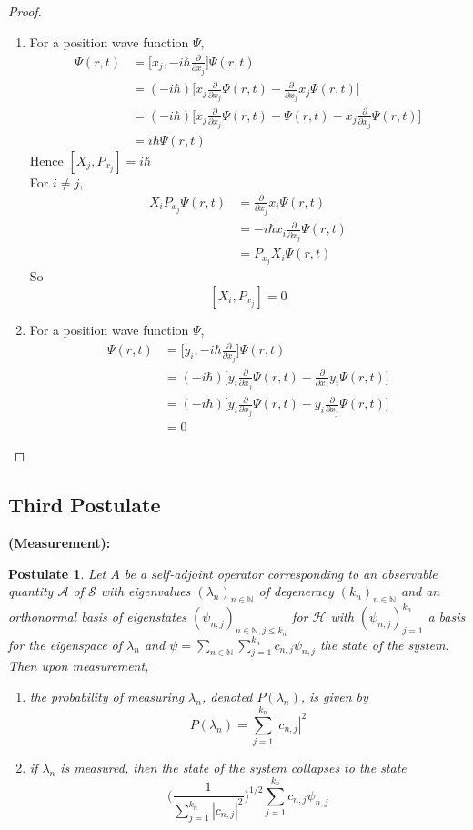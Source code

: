\documentclass[12pt]{amsart}
\newtheorem{pos}{Postulate}
\newcommand{\lam}{\lambda}
\newcommand{\N}{\mathbb{N}}
\newcommand{\MA}{\mathcal{A}}
\newcommand{\MS}{\mathcal{S}}
\newcommand{\MH}{\mathcal{H}}
\newcommand{\p}[1]{\frac{\partial}{\partial{#1}}}
\begin{document}
\begin{proof}\
	\begin{enumerate}
		\item For a position wave function $\Psi$, 
		\begin{align*}
			[X_j, P_j]\Psi(r,t)
			&= \bigg[x_j, -i\hbar \p{x_j} \bigg]\Psi(r,t)\\
			&= (-i\hbar) \bigg[x_j \p{x_j}\Psi(r,t)- \p{x_j}x_j\Psi(r,t)\bigg]\\
			&= (-i\hbar)\bigg[ x_j \p{x_j}\Psi(r,t)- \Psi(r,t) - x_j \p{x_j}\Psi(r,t)\bigg]\\
			&=i\hbar \Psi(r,t)
		\end{align*}
		Hence $[X_j, P_{x_j}] = i\hbar$\vspace{.5cm}\\
		For $i\neq j$, 
		\begin{align*}
			X_iP_{x_j} \Psi(r,t)
			&= \p{x_j}x_i \Psi(r,t)\\
			& = -i \hbar x_i \p{x_j}\Psi(r,t) \\
			&= P_{x_j}X_i \Psi(r,t)
		\end{align*}
		So $$[X_i,P_{x_j}] =0 $$
		\item For a position wave function $\Psi$, 
		\begin{align*}
			[Y_i, P_{x_j}]\Psi(r,t)
			&= \bigg[y_i, -i\hbar \p{x_j}\bigg]\Psi(r,t)\\
			&= (-i\hbar) \bigg[y_i \p{x_j}\Psi(r,t)- \p{x_j}y_i\Psi(r,t)\bigg]\\
			&= (-i\hbar) \bigg[y_i \p{x_j}\Psi(r,t)- y_i\p{x_j}\Psi(r,t)\bigg]\\
			&= 0
		\end{align*}
		
	\end{enumerate}
\end{proof}

\subsection{Third Postulate}\textbf{(Measurement):}
	

	\begin{pos}
		Let $A$ be a self-adjoint operator corresponding to an observable quantity $\MA$ of $\MS$ with eigenvalues $(\lam_{n})_{n \in \N}$ of degeneracy $(k_n)_{n \in \N}$ and an orthonormal basis of eigenstates $(\psi_{n,j})_{n \in \N,j \leq k_n}$ for $\MH$ with $(\psi_{n,j})_{j =1}^{k_n}$ a basis for the eigenspace of $\lam_n$ and $\psi = \sum_{n \in \N} \sum_{j = 1}^{k_n} c_{n,j} \psi_{n,j}$ the state of the system. Then upon measurement,
		\begin{enumerate}
			\item  the probability of measuring $\lam_n$, denoted $P(\lam_n)$, is given by  $$P(\lam_n) = \sum_{j=1}^{k_n} |c_{n,j}|^2$$
			\item if $\lam_n$ is measured, then the state of the system collapses to the state $$ \bigg( \frac{1}{\sum_{j=1}^{k_n} |c_{n,j}|^2} \bigg)^{1/2} \sum_{j=1}^{k_n}c_{n,j} \psi_{n,j}$$ 
		\end{enumerate}
	\end{pos}
\end{document}
